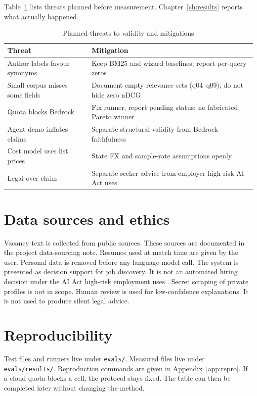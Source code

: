Table~\ref{tab:threats-plan} lists threats planned before measurement. Chapter~\ref{ch:results} reports what actually happened.

\begin{table}[ht]
\centering
\caption{Planned threats to validity and mitigations}
\label{tab:threats-plan}
\begin{tabularx}{\textwidth}{@{}lX@{}}
\toprule
\textbf{Threat} & \textbf{Mitigation} \\
\midrule
Author labels favour synonyms & Keep BM25 and wizard baselines; report per-query zeros \\
Small corpus misses some fields & Document empty relevance sets (q04--q09); do not hide zero nDCG \\
Quota blocks Bedrock & Fix runner; report pending status; no fabricated Pareto winner \\
Agent demo inflates claims & Separate structural validity from Bedrock faithfulness \\
Cost model uses list prices & State FX and sample-rate assumptions openly \\
Legal over-claim & Separate seeker advice from employer high-risk AI Act uses \\
\bottomrule
\end{tabularx}
\end{table}

\section{Data sources and ethics}
\label{sec:ethics}

Vacancy text is collected from public sources. These sources are documented in the project data-sourcing note. Resumes used at match time are given by the user. Personal data is removed before any language-model call. The system is presented as decision support for job discovery. It is not an automated hiring decision under the AI Act high-risk employment uses . Secret scraping of private profiles is not in scope. Human review is used for low-confidence explanations. It is not used to produce silent legal advice.

\section{Reproducibility}
\label{sec:repro}

Test files and runners live under \texttt{evals/}. Measured files live under \texttt{evals/results/}. Reproduction commands are given in Appendix~\ref{app:repro}. If a cloud quota blocks a cell, the protocol stays fixed. The table can then be completed later without changing the method.
